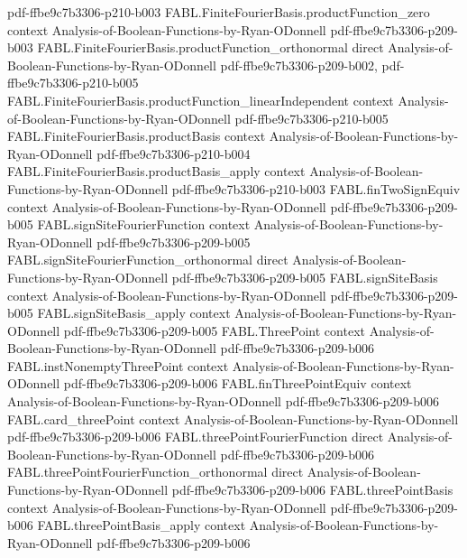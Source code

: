 \begin{theorem}
{    pdf-ffbe9c7b3306-p210-b003}
\proofstep
  {FABL.FiniteFourierBasis.productFunction_zero}
  {context}
  {Analysis-of-Boolean-Functions-by-Ryan-ODonnell}
  {pdf-ffbe9c7b3306-p209-b003}
\proofstep
  {FABL.FiniteFourierBasis.productFunction_orthonormal}
  {direct}
  {Analysis-of-Boolean-Functions-by-Ryan-ODonnell}
  {pdf-ffbe9c7b3306-p209-b002,
    pdf-ffbe9c7b3306-p210-b005}
\proofstep
  {FABL.FiniteFourierBasis.productFunction_linearIndependent}
  {context}
  {Analysis-of-Boolean-Functions-by-Ryan-ODonnell}
  {pdf-ffbe9c7b3306-p210-b005}
\proofstep
  {FABL.FiniteFourierBasis.productBasis}
  {context}
  {Analysis-of-Boolean-Functions-by-Ryan-ODonnell}
  {pdf-ffbe9c7b3306-p210-b004}
\proofstep
  {FABL.FiniteFourierBasis.productBasis_apply}
  {context}
  {Analysis-of-Boolean-Functions-by-Ryan-ODonnell}
  {pdf-ffbe9c7b3306-p210-b003}
\proofstep
  {FABL.finTwoSignEquiv}
  {context}
  {Analysis-of-Boolean-Functions-by-Ryan-ODonnell}
  {pdf-ffbe9c7b3306-p209-b005}
\proofstep
  {FABL.signSiteFourierFunction}
  {context}
  {Analysis-of-Boolean-Functions-by-Ryan-ODonnell}
  {pdf-ffbe9c7b3306-p209-b005}
\proofstep
  {FABL.signSiteFourierFunction_orthonormal}
  {direct}
  {Analysis-of-Boolean-Functions-by-Ryan-ODonnell}
  {pdf-ffbe9c7b3306-p209-b005}
\proofstep
  {FABL.signSiteBasis}
  {context}
  {Analysis-of-Boolean-Functions-by-Ryan-ODonnell}
  {pdf-ffbe9c7b3306-p209-b005}
\proofstep
  {FABL.signSiteBasis_apply}
  {context}
  {Analysis-of-Boolean-Functions-by-Ryan-ODonnell}
  {pdf-ffbe9c7b3306-p209-b005}
\proofstep
  {FABL.ThreePoint}
  {context}
  {Analysis-of-Boolean-Functions-by-Ryan-ODonnell}
  {pdf-ffbe9c7b3306-p209-b006}
\proofstep
  {FABL.instNonemptyThreePoint}
  {context}
  {Analysis-of-Boolean-Functions-by-Ryan-ODonnell}
  {pdf-ffbe9c7b3306-p209-b006}
\proofstep
  {FABL.finThreePointEquiv}
  {context}
  {Analysis-of-Boolean-Functions-by-Ryan-ODonnell}
  {pdf-ffbe9c7b3306-p209-b006}
\proofstep
  {FABL.card_threePoint}
  {context}
  {Analysis-of-Boolean-Functions-by-Ryan-ODonnell}
  {pdf-ffbe9c7b3306-p209-b006}
\proofstep
  {FABL.threePointFourierFunction}
  {direct}
  {Analysis-of-Boolean-Functions-by-Ryan-ODonnell}
  {pdf-ffbe9c7b3306-p209-b006}
\proofstep
  {FABL.threePointFourierFunction_orthonormal}
  {direct}
  {Analysis-of-Boolean-Functions-by-Ryan-ODonnell}
  {pdf-ffbe9c7b3306-p209-b006}
\proofstep
  {FABL.threePointBasis}
  {context}
  {Analysis-of-Boolean-Functions-by-Ryan-ODonnell}
  {pdf-ffbe9c7b3306-p209-b006}
\proofstep
  {FABL.threePointBasis_apply}
  {context}
  {Analysis-of-Boolean-Functions-by-Ryan-ODonnell}
  {pdf-ffbe9c7b3306-p209-b006}

\end{theorem}
